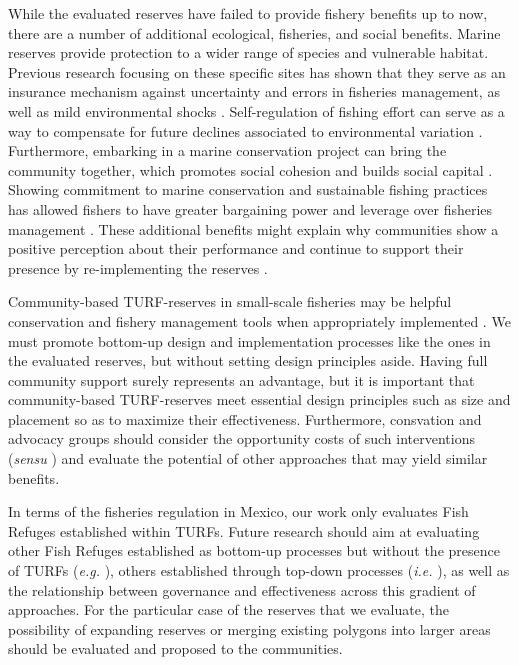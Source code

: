 \documentclass{frontiersSCNS}
\begin{document}
While the evaluated reserves have failed to provide fishery benefits up
to now, there are a number of additional ecological, fisheries, and
social benefits. Marine reserves provide protection to a wider range of
species and vulnerable habitat. Previous research focusing on these
specific sites has shown that they serve as an insurance mechanism
against uncertainty and errors in fisheries management, as well as mild
environmental shocks
\citep{micheli_2012-EU,deleo_2015,roberts_2017-J9,aalto}.
Self-regulation of fishing effort can serve as a way to compensate for
future declines associated to environmental variation
\citep{finkbeiner_2018}. Furthermore, embarking in a marine conservation
project can bring the community together, which promotes social cohesion
and builds social capital \citep{fulton_2019}. Showing commitment to
marine conservation and sustainable fishing practices has allowed
fishers to have greater bargaining power and leverage over fisheries
management \citep{prezramrez_2012}. These additional benefits might
explain why communities show a positive perception about their
performance and continue to support their presence by re-implementing
the reserves \citep{ayer_2018}.

Community-based TURF-reserves in small-scale fisheries may be helpful
conservation and fishery management tools when appropriately implemented
\citep{gelcich_2015}. We must promote bottom-up design and
implementation processes like the ones in the evaluated reserves, but
without setting design principles aside. Having full community support
surely represents an advantage, but it is important that community-based
TURF-reserves meet essential design principles such as size and
placement so as to maximize their effectiveness. Furthermore, consvation
and advocacy groups should consider the opportunity costs of such
interventions (\emph{sensu} \citet{smith_2010}) and evaluate the
potential of other approaches that may yield similar benefits.

In terms of the fisheries regulation in Mexico, our work only evaluates
Fish Refuges established within TURFs. Future research should aim at
evaluating other Fish Refuges established as bottom-up processes but
without the presence of TURFs (\emph{e.g.} \citet{dof_websiteC_2012}),
others established through top-down processes (\emph{i.e.}
\citet{dof_websiteU_2018}), as well as the relationship between
governance and effectiveness across this gradient of approaches. For the
particular case of the reserves that we evaluate, the possibility of
expanding reserves or merging existing polygons into larger areas should
be evaluated and proposed to the communities.
\end{document}
